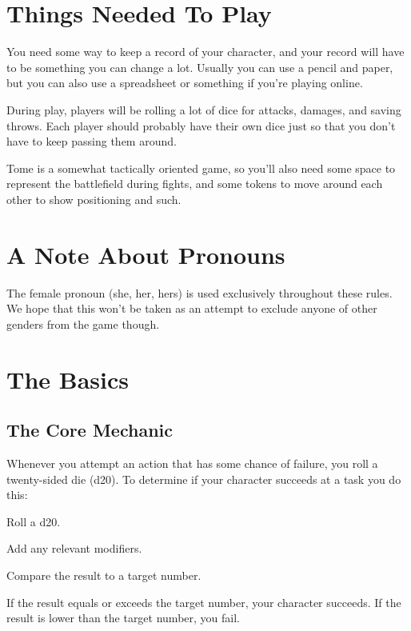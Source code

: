 \section{Things Needed To Play}

You need some way to keep a record of your character, and your record will have to be something you can change a lot. Usually you can use a pencil and paper, but you can also use a spreadsheet or something if you're playing online.

During play, players will be rolling a lot of dice for attacks, damages, and saving throws. Each player should probably have their own dice just so that you don't have to keep passing them around.

Tome is a somewhat tactically oriented game, so you'll also need some space to represent the battlefield during fights, and some tokens to move around each other to show positioning and such.

\section{A Note About Pronouns}

The female pronoun (she, her, hers) is used exclusively throughout these rules. We hope that this won't be taken as an attempt to exclude anyone of other genders from the game though.

\section{The Basics}

\subsection{The Core Mechanic}
Whenever you attempt an action that has some chance of failure, you roll a twenty-sided die (d20). To determine if your character succeeds at a task you do this:
\begin{itemize*}
\item Roll a d20.
\item Add any relevant modifiers.
\item Compare the result to a target number.
\end{itemize*}
If the result equals or exceeds the target number, your character succeeds. If the result is lower than the target number, you fail.

